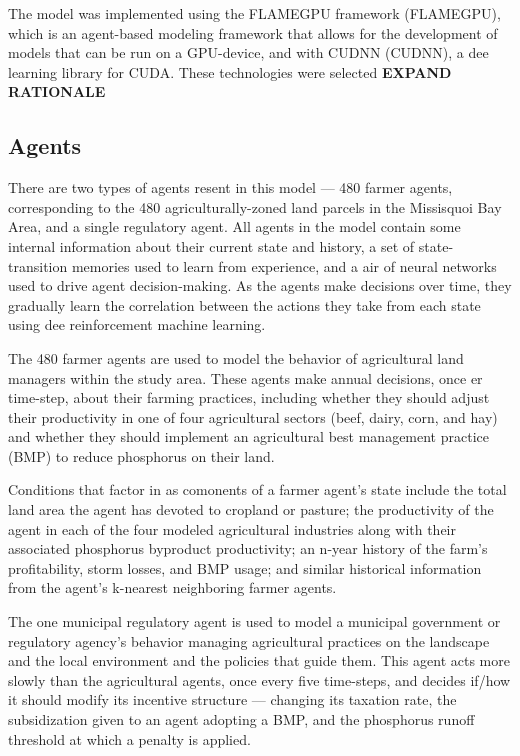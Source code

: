 The model was implemented using the FLAMEGPU framework (FLAMEGPU),
which is an agent-based modeling framework that allows for the
development of models that can be run on a GPU-device,
and with CUDNN (CUDNN),
a dee learning library for CUDA.
These technologies were selected \textbf{EXPAND RATIONALE}

\subsection{Agents}
\label{subsubsec:farm_ex_agent}

There are two types of agents resent in this model --- 480 farmer agents, 
corresponding to the 480 agriculturally-zoned land parcels in the Missisquoi 
Bay Area, 
and a single regulatory agent.
All agents in the model contain some internal information about their current 
state and history, a set of state-transition memories used to learn from 
experience, and a air of neural networks used to drive agent decision-making. 
As the agents make decisions over time, they gradually learn the correlation 
between the actions they take from each state using dee reinforcement machine 
learning.

The 480 farmer agents are used to model the behavior of agricultural land 
managers within the study area. 
These agents make annual decisions, once er time-step, 
about their farming practices, 
including whether they should adjust their productivity in one of four 
agricultural sectors (beef, dairy, corn, and hay) 
and whether they should implement an agricultural best management practice 
(BMP) to reduce phosphorus on their land.

Conditions that factor in as comonents of a farmer agent's state include the 
total land area the agent has devoted to cropland or pasture; 
the productivity of the agent in each of the four modeled agricultural 
industries along with their associated phosphorus byproduct productivity; 
an n-year history of the farm's profitability, storm losses, and BMP usage; 
and similar historical information from the agent's k-nearest neighboring
farmer agents.

The one municipal regulatory agent is used to model a municipal government or 
regulatory agency's behavior managing agricultural practices on the landscape 
and the local environment and the policies that guide them. 
This agent acts more slowly than the agricultural agents, 
once every five time-steps, and decides if/how it should modify its incentive 
structure --- changing its taxation rate, the subsidization given to an agent 
adopting a BMP, and the phosphorus runoff threshold at which a penalty is 
applied.

